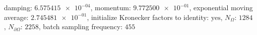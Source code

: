 damping: $\num[scientific-notation=true]{6.575415e-04}$, momentum: $\num[scientific-notation=true]{9.772500e-01}$, exponential moving average: $\num[scientific-notation=true]{2.745481e-01}$, initialize Kronecker factors to identity: $\text{yes}$, $N_{\Omega}$: $\num[scientific-notation=false]{1284}$, $N_{\partial\Omega}$: $\num[scientific-notation=false]{2258}$, batch sampling frequency: $\num[scientific-notation=false]{455}$